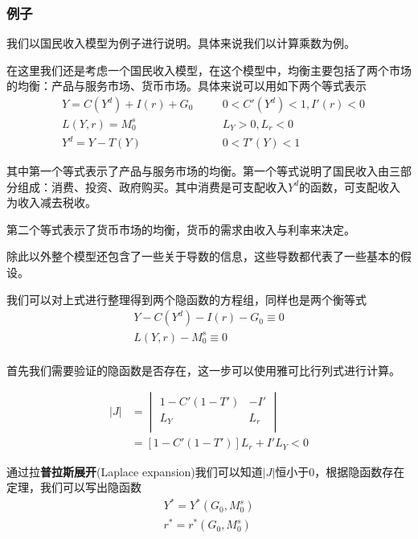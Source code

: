 \documentclass[UTF8,12pt]{ctexart}
\numberwithin{equation}{section} %
\numberwithin{figure}{section}
\numberwithin{table}{section}
\begin{document}
	\subsubsection{例子}
	我们以国民收入模型为例子进行说明。具体来说我们以计算乘数为例。
	
	在这里我们还是考虑一个国民收入模型，在这个模型中，均衡主要包括了两个市场的均衡：产品与服务市场、货币市场。具体来说可以用如下两个等式表示
	\begin{equation}
		\begin{aligned}
			&Y = C(Y^d) + I(r) + G_0 \quad &&0<C'(Y^d)<1,I'(r) < 0\\
			&L(Y,r) = M_0^s \quad &&L_Y>0,L_r < 0 \\
			&Y^d = Y-T(Y) \quad &&0< T'(Y) < 1
		\end{aligned}
	\end{equation}
	
	其中第一个等式表示了产品与服务市场的均衡。第一个等式说明了国民收入由三部分组成：消费、投资、政府购买。其中消费是可支配收入$Y^d$的函数，可支配收入为收入减去税收。
	
	第二个等式表示了货币市场的均衡，货币的需求由收入与利率来决定。
	
	除此以外整个模型还包含了一些关于导数的信息，这些导数都代表了一些基本的假设。
	
	我们可以对上式进行整理得到两个隐函数的方程组，同样也是两个衡等式
	\begin{equation}
		\begin{aligned}
			Y - C(Y^d) - I(r) - G_0 \equiv 0 \\
			L(Y,r) - M_0^s \equiv 0\\
		\end{aligned}
	\end{equation}
	
	首先我们需要验证的隐函数是否存在，这一步可以使用雅可比行列式进行计算。
	
	\begin{equation}
		\begin{aligned}
			|J| &= 
			\begin{vmatrix}
				1-C'(1-T')  & -I' \\
				L_{Y} & L_{r} \\
			\end{vmatrix} \\
			&= [1-C'(1-T')]L_r + I'L_Y < 0
		\end{aligned}		 
	\end{equation}
	
	
	
	通过拉\textbf{普拉斯展开}(Laplace expansion)我们可以知道$|J|$恒小于0，根据隐函数存在定理，我们可以写出隐函数
	\begin{equation}
		\begin{aligned}
			Y^* = Y^*(G_0,M_0^s) \\
			r^* = r^*(G_0,M_0^s) \\
		\end{aligned}
	\end{equation}
	
\end{document}
